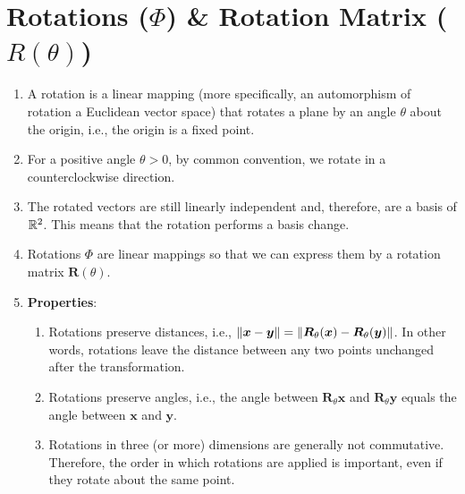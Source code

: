 \section{Rotations ($\Phi$) \& Rotation Matrix ($R(\theta)$)}



\begin{enumerate}
    \item A rotation is a linear mapping (more specifically, an automorphism of rotation a Euclidean vector space) that rotates a plane by an angle $\theta$ about the origin, i.e., the origin is a fixed point.
    \hfill \cite{mfml/book/mml/Deisenroth-Faisal-Ong}
    
    \item For a positive angle $\theta > 0$, by common convention, we rotate in a counterclockwise direction.
    \hfill \cite{mfml/book/mml/Deisenroth-Faisal-Ong}

    \item The rotated vectors are still linearly independent and, therefore, are a basis of $\mathbb{R}^2$. 
    This means that the rotation performs a basis change.
    \hfill \cite{mfml/book/mml/Deisenroth-Faisal-Ong}

    \item Rotations $\Phi$ are linear mappings so that we can express them by a rotation matrix $\bm{R}(\theta)$. 
    \hfill \cite{mfml/book/mml/Deisenroth-Faisal-Ong}

    \item \textbf{Properties}:
    \begin{enumerate}
        \item Rotations preserve distances, i.e., $\left\| \bm{x}-\bm{y} \right\| = \left\| \bm{R}_\theta (\bm{x}) - \bm{R}_\theta (\bm{y}) \right\|$. In other words, rotations leave the distance between any two points unchanged after the transformation.
        \hfill \cite{mfml/book/mml/Deisenroth-Faisal-Ong}

        \item Rotations preserve angles, i.e., the angle between $\bm{R}_\theta \bm{x}$ and $\bm{R}_\theta \bm{y}$ equals the angle between $\bm{x}$ and $\bm{y}$.
        \hfill \cite{mfml/book/mml/Deisenroth-Faisal-Ong}

        \item Rotations in three (or more) dimensions are generally not commutative. 
        Therefore, the order in which rotations are applied is important, even if they rotate about the same point. 
        \hfill \cite{mfml/book/mml/Deisenroth-Faisal-Ong}
        

\end{enumerate}
\end{enumerate}
